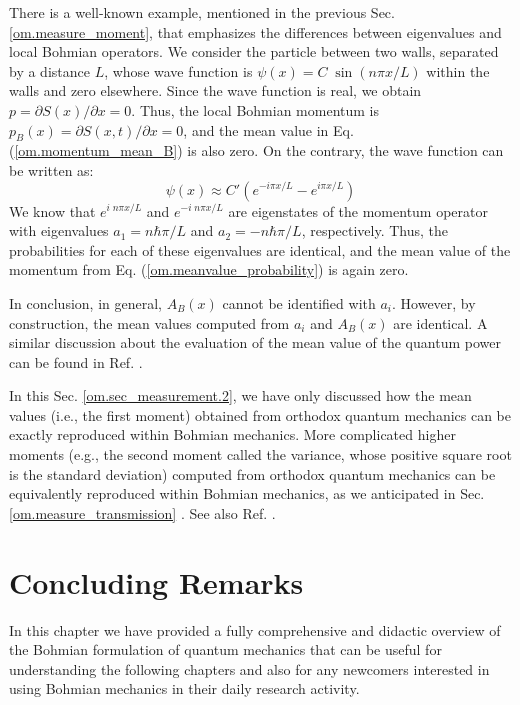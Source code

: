 \documentclass[onecolumn,nofootinbib, secnumarabic, amsmath, nobibnotes,12pt,aps,pra]{revtex4-1}
\newcommand{\sref}[1]{Sec. \ref{#1}}
\newcommand{\eref}[1]{Eq. (\ref{#1})}
\begin{document}
There is a well-known example, mentioned in the previous
\sref{om.measure_moment}, that emphasizes the differences between
eigenvalues and local Bohmian operators. We consider the particle
between two walls, separated by a distance $L$, whose wave function
is $\psi(x) = C \; \sin(n\pi x/L)$ within the walls and zero
elsewhere. Since the wave function is real, we obtain $p = \partial
S(x)/\partial x = 0$. Thus, the local Bohmian momentum is $p_B(x) =
{\partial S(x,t)}/{\partial x} = 0$, and the mean value in
\eref{om.momentum_mean_B} is also zero. On the contrary, the wave
function can be written as:
\begin{equation}
\psi(x) \approx C' \left(e^{-i\pi x/L}-e^{i\pi x/L} \right)
\end{equation}
We know that $e^{i \; n \pi x/L}$ and $e^{-i \; n \pi x/L}$ are
eigenstates of the momentum operator with eigenvalues $a_1 = n \hbar
\pi/L$ and $a_2 = -n \hbar \pi/L$, respectively. Thus, the
probabilities for each of these eigenvalues are identical, and the
mean value of the momentum from \eref{om.meanvalue_probability} is
again zero.

In conclusion, in general, $A_B(x)$ cannot be identified with $a_i$.
However, by construction, the mean values computed from $a_i$ and
$A_B(x)$ are identical. A similar discussion about the evaluation of
the mean value of the  quantum power can be found in Ref.
\cite{om.quantumpower}.

In this \sref{om.sec_measurement.2}, we have only discussed how the
mean values (i.e., the first moment) obtained from orthodox quantum
mechanics can be exactly reproduced within Bohmian mechanics. More
complicated higher moments (e.g., the second moment called the
variance, whose positive square root is the standard deviation)
computed from orthodox quantum mechanics can be equivalently
reproduced within Bohmian mechanics, as we anticipated in
\sref{om.measure_transmission} \cite{om.Durrnaive,om.Durrllibre,
om.goldstein}. See also Ref. \cite{om.Muga}.


\section{Concluding Remarks}

In this chapter we have provided a fully comprehensive and didactic overview of the Bohmian formulation of quantum mechanics that can be useful for understanding the following chapters and also for any newcomers interested in using Bohmian mechanics in their daily research activity.
\end{document}
